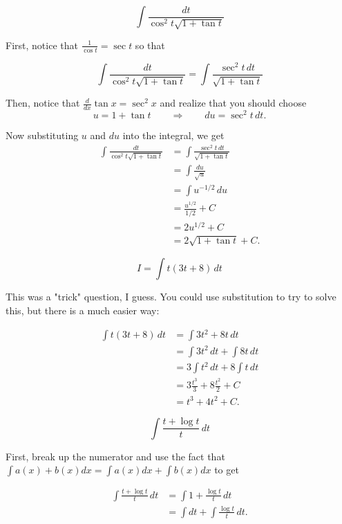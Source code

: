 \documentclass[12pt, letterpaper]{article}
\begin{document}
$$ \int \frac{dt}{\cos^2{t}\sqrt{1 + \tan{t}}} $$

First, notice that $\frac{1}{\cos{t}} = \sec{t}$ so that 

$$\int \frac{dt}{\cos^2{t}\sqrt{1 + \tan{t}}} = \int \frac{\sec^2{t} \, dt}{\sqrt{1 + \tan{t}}} $$

Then, notice that $\frac{d}{dx}\tan{x} = \sec^2{x}$ and realize that you should choose
$$u = 1 + \tan{t} \qquad\Rightarrow\qquad du = \sec^2{t} \, dt.$$

Now substituting $u$ and $du$ into the integral, we get
\begin{equation}
\begin{aligned}
\int \frac{dt}{\cos^2{t}\sqrt{1 + \tan{t}}}
   &= \int \frac{\sec^2{t} \, dt}{\sqrt{1 + \tan{t}}} \\[0.2in]
   &= \int \frac{du}{\sqrt{u}} \\[0.2in]
   &= \int u^{-1/2} \, du \\[0.2in]
   &= \frac{u^{1/2}}{1/2} + C \\[0.2in]
   &= 2u^{1/2} + C \\[0.2in]
   &= 2\sqrt{1 + \tan{t}} + C.
\end{aligned}
\end{equation}

\newpage

$$ I = \int t \left( 3t + 8 \right) \, dt $$

This was a "trick" question, I guess. You could use substitution to try to solve this, but there is a much easier way:

\begin{equation}
\begin{aligned}
\int t \left( 3t + 8 \right) \, dt
  &= \int 3t^2 + 8t \, dt \\[0.2in]
  &= \int 3t^2 \, dt + \int 8t \, dt \\[0.2in]
  &= 3 \int t^2 \, dt + 8 \int t \, dt \\[0.2in]
  &= 3 \frac{t^3}{3} + 8 \frac{t^2}{2} + C \\[0.2in]
  &= t^3 + 4t^2 + C.
\end{aligned}
\end{equation}

\newpage

$$ \int \frac{t + \log{t}}{t} \, dt $$

First, break up the numerator and use the fact that $\int a(x) + b(x) dx = \int a(x) dx + \int b(x) dx$ to get

\begin{equation}
\begin{aligned}
\int \frac{t + \log{t}}{t} \, dt
  &= \int 1 + \frac{\log{t}}{t} \, dt \\[0.2in]
  &= \int dt + \int \frac{\log{t}}{t} \, dt.
\end{aligned}
\end{equation}
\end{document}
